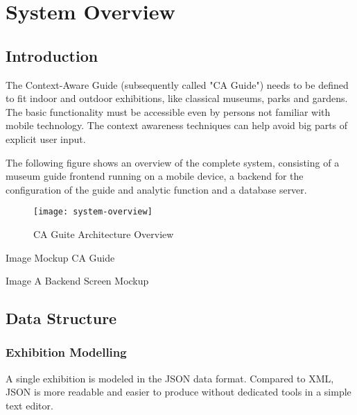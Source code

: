 
\chapter{System Overview} %

\label{systemoverview} %



\section{Introduction}

The Context-Aware Guide (subsequently called "CA Guide") needs to be defined to fit indoor and outdoor exhibitions, like classical museums, parks and gardens. 
The basic functionality must be accessible even by persons not familiar with mobile technology. The context awareness techniques can help avoid big parts of explicit user input.

The following figure shows an overview of the complete system, consisting of a museum guide frontend running on a mobile device, a backend for the configuration of the guide and analytic function and a database server.

\begin{figure}[H]
\centering
\texttt{[image: system-overview]}
\caption{CA Guite Architecture Overview}
\end{figure}

Image Mockup CA Guide 

Image A Backend Screen Mockup

\section{Data Structure}

\subsection{Exhibition Modelling}

A single exhibition is modeled in the JSON data format. Compared to XML, JSON is more readable and easier to produce without dedicated tools in a simple text editor.


